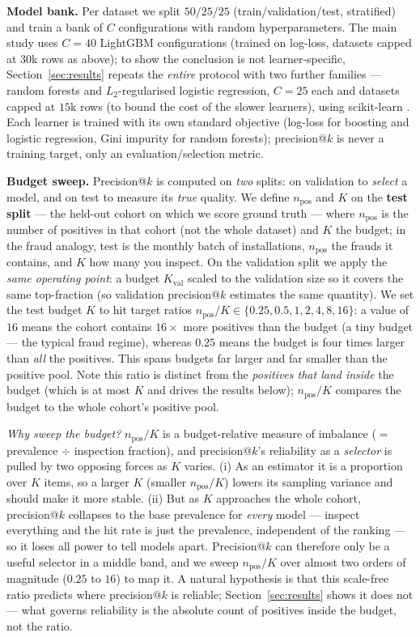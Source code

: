 \documentclass[11pt]{article}
\begin{document}
\textbf{Model bank.} Per dataset we split $50/25/25$ (train/validation/test, stratified) and
train a bank of $C$ configurations with random hyperparameters. The main study uses $C=40$
LightGBM \citep{ke2017lightgbm} configurations (trained on log-loss, datasets capped at $30$k
rows as above); to show the conclusion is not learner-specific, Section~\ref{sec:results}
repeats the \emph{entire} protocol with two further families --- random forests and
$L_2$-regularised logistic regression, $C=25$ each and datasets capped at $15$k rows (to bound
the cost of the slower learners), using scikit-learn \citep{pedregosa2011scikit}. Each learner is trained with its own standard
objective (log-loss for boosting and logistic regression, Gini impurity for random forests);
precision@$k$ is never a training target, only an evaluation/selection metric.

\textbf{Budget sweep.} Precision@$k$ is computed on \emph{two} splits: on validation to
\emph{select} a model, and on test to measure its \emph{true} quality. We define $n_{\text{pos}}$
and $K$ on the \textbf{test split} --- the held-out cohort on which we score ground truth ---
where $n_{\text{pos}}$ is the number of positives in that cohort (not the whole dataset) and $K$
the budget; in the fraud analogy, test is the monthly batch of installations, $n_{\text{pos}}$
the frauds it contains, and $K$ how many you inspect. On the validation split we apply the
\emph{same operating point}: a budget $K_{\text{val}}$ scaled to the validation size so it covers
the same top-fraction (so validation precision@$k$ estimates the same quantity). We set the test
budget $K$ to hit target ratios $n_{\text{pos}}/K \in \{0.25,0.5,1,2,4,8,16\}$: a value of $16$ means the
cohort contains $16\times$ more positives than the budget (a tiny budget --- the typical fraud
regime), whereas $0.25$ means the budget is four times larger than \emph{all} the positives.
This spans budgets far larger and far smaller than the positive pool. Note this ratio is
distinct from the \emph{positives that land inside} the budget (which is at most $K$ and drives
the results below); $n_{\text{pos}}/K$ compares the budget to the whole cohort's positive pool.

\textit{Why sweep the budget?} $n_{\text{pos}}/K$ is a budget-relative measure of imbalance
($=$ prevalence $\div$ inspection fraction), and precision@$k$'s reliability as a
\emph{selector} is pulled by two opposing forces as $K$ varies. (i) As an estimator it is a
proportion over $K$ items, so a larger $K$ (smaller $n_{\text{pos}}/K$) lowers its sampling
variance and should make it more stable. (ii) But as $K$ approaches the whole cohort,
precision@$k$ collapses to the base prevalence for \emph{every} model --- inspect everything and
the hit rate is just the prevalence, independent of the ranking --- so it loses all power to
tell models apart. Precision@$k$ can therefore only be a useful selector in a middle band, and
we sweep $n_{\text{pos}}/K$ over almost two orders of magnitude ($0.25$ to $16$) to map it. A natural hypothesis is that
this scale-free ratio predicts where precision@$k$ is reliable; Section~\ref{sec:results} shows
it does not --- what governs reliability is the absolute count of positives inside the budget,
not the ratio.
\end{document}

